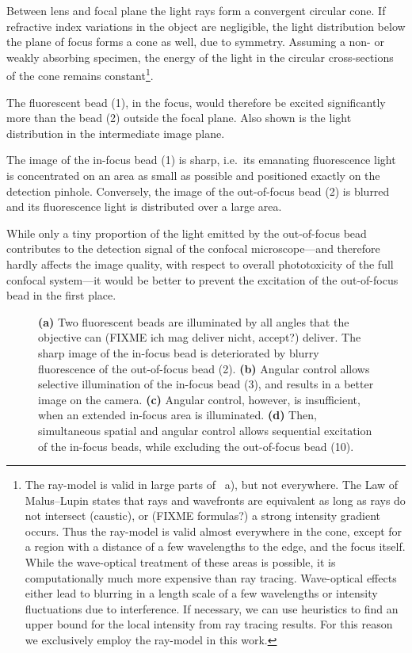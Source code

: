 Between lens and focal plane the light rays form a convergent circular
cone. If refractive index variations in the object are negligible, the
light distribution below the plane of focus forms a cone as well, due
to symmetry.  Assuming a non- or weakly absorbing specimen, the energy
of the light in the circular cross-sections of the cone remains
constant\footnote{The ray-model is valid in large
  parts of ~a), but not everywhere. The Law
  of Malus--Lupin states that rays and wavefronts are equivalent as
  long as rays do not intersect (caustic), or (FIXME formulas?) a
  strong intensity gradient occurs. Thus the ray-model is valid almost
  everywhere in the cone, except for a region with a distance of a few
  wavelengths to the edge, and the focus itself. While the wave-optical
  treatment of these areas is possible, it is computationally much
  more expensive than ray tracing. Wave-optical effects either lead to
  blurring in a length scale of a few wavelengths or intensity
  fluctuations due to interference. If necessary, we can use heuristics
  to find an upper bound for the local intensity from ray tracing
  results. For this reason we exclusively employ the ray-model in this
  work.}.


The fluorescent bead (1), in the focus, would therefore be excited
significantly more than the bead (2) outside the focal plane. Also
shown is the light distribution in the intermediate image plane.

The image of the in-focus bead (1) is sharp, i.e.\ its emanating
fluorescence light is concentrated on an area as small as possible and
positioned exactly on the detection pinhole. Conversely, the image of
the out-of-focus bead (2) is blurred and its fluorescence light is
distributed over a large area.

While only a tiny proportion of the light emitted by the out-of-focus
bead contributes to the detection signal of the confocal microscope---and
 therefore hardly affects the image quality, with respect to
overall phototoxicity of the full confocal system---it would be better
to prevent the excitation of the out-of-focus bead in the first place.

\begin{figure}[!hbt]
  \centering
  \caption{{\bf (a)} Two fluorescent beads are illuminated by all
    angles that the objective can (FIXME ich mag deliver nicht,
    accept?) deliver. The sharp image of the in-focus bead is
    deteriorated by blurry fluorescence of the out-of-focus bead (2). {\bf
      (b)} Angular control allows selective illumination of the
    in-focus bead (3), and results in a better image on the camera. {\bf
      (c)} Angular control, however, is insufficient, when an extended in-focus
    area is illuminated. {\bf (d)} Then, simultaneous spatial and
    angular control allows sequential excitation of the in-focus beads,
    while excluding the out-of-focus bead (10).}
  \label{fig:hourglass-all}
\end{figure}

